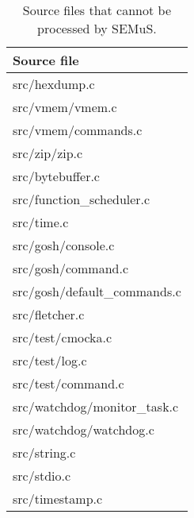 
\begin{table}[h]
\scriptsize
\centering
\caption{Source files that cannot be processed by SEMuS.}
\label{table:not_processable}
\begin{tabular}{l}
\hline
\textbf{Source file}\\
\hline
src/hexdump.c\\
src/vmem/vmem.c\\
src/vmem/commands.c\\
src/zip/zip.c\\
src/bytebuffer.c\\
src/function\_scheduler.c\\
src/time.c\\
src/gosh/console.c\\
src/gosh/command.c\\
src/gosh/default\_commands.c\\
src/fletcher.c\\
src/test/cmocka.c\\
src/test/log.c\\
src/test/command.c\\
src/watchdog/monitor\_task.c\\
src/watchdog/watchdog.c\\
src/string.c\\
src/stdio.c\\
src/timestamp.c\\
\hline
\end{tabular}
\end{table}